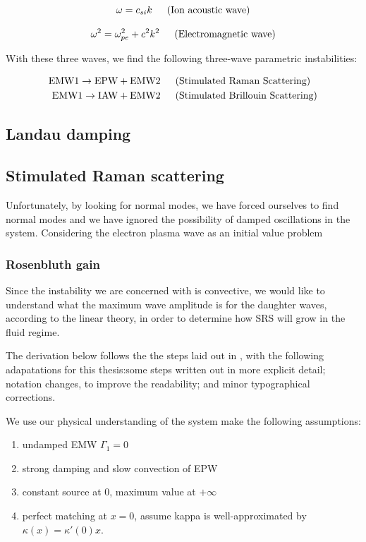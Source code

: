\begin{equation}
 \omega =  c_{si} k \text{\,\,\,\,\,\,\,\,\,(Ion acoustic wave)}
\end{equation}

\begin{equation}
 \omega^{2}=\omega_{p e}^{2}+c^2k^{2} \text{\,\,\,\,\,\,\,\,\,(Electromagnetic wave)}
\end{equation}

With these three waves, we find the following three-wave parametric instabilities:


\begin{align*}
	 	\text{EMW1} \rightarrow \text{EPW} + \text{EMW2} &\text{\,\,\,\,\,\,\,\,\,(Stimulated Raman Scattering)}\\
	 	\text{EMW1} \rightarrow \text{IAW} + \text{EMW2} &\text{\,\,\,\,\,\,\,\,\,(Stimulated Brillouin Scattering)}\\
\end{align*}


\subsection{Landau damping}

\subsection{Stimulated Raman scattering}

Unfortunately, by looking for normal modes, we have forced ourselves to find normal modes and we have ignored the possibility of damped oscillations in the system. Considering the electron plasma wave as an initial value problem 

\subsubsection{Rosenbluth gain}

Since the instability we are concerned with is convective, we would like to understand what the maximum wave amplitude is for the daughter waves, according to the linear theory, in order to determine how SRS will grow in the fluid regime.

The derivation below follows the the steps laid out in \citet{Nishikawa1976}, with the following adapatations for this thesis:some steps written out in more explicit detail; notation changes, to improve the readability; and minor typographical corrections. 

We use our physical understanding of the system make the following assumptions:
\begin{enumerate}
	\item undamped EMW $\Gamma_1 = 0$
	\item strong damping and slow convection of EPW
	\item constant source at 0, maximum value at $+\infty$
	\item perfect matching at $x=0$, assume kappa is well-approximated by 
	$\kappa(x) = \kappa'(0)x$.
\end{enumerate}

